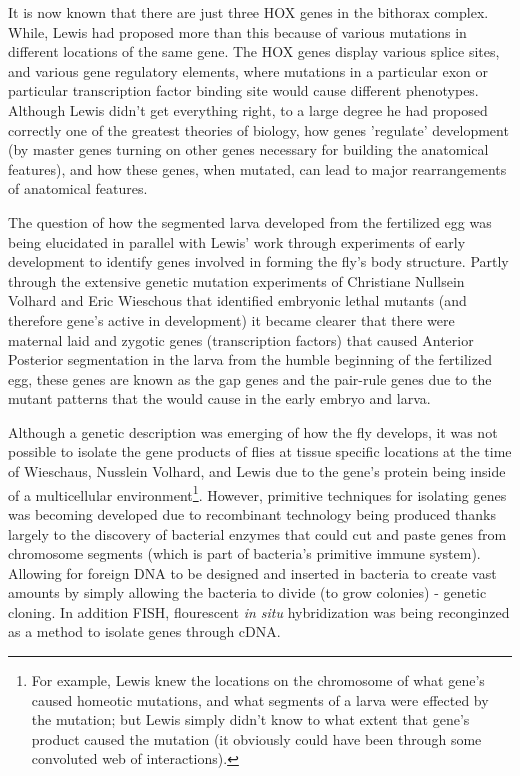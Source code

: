 It is now known that there are just three HOX genes in the bithorax complex.  While, Lewis had proposed more than this because of various mutations in different locations of the same gene.  The HOX genes display various splice sites, and various gene regulatory elements, where mutations in a particular exon or particular transcription factor binding site would cause different phenotypes.  Although Lewis didn't get everything right, to a large degree he had proposed correctly one of the greatest theories of biology, how genes 'regulate' development (by master genes turning on other genes necessary for building the anatomical features), and how these genes, when mutated, can lead to major rearrangements of anatomical features. 

The question of how the segmented larva developed from the fertilized egg was being elucidated in parallel with Lewis' work through experiments of early development to identify genes involved in forming the fly's body structure.  Partly through the extensive genetic mutation experiments of Christiane Nullsein Volhard and Eric Wieschous that identified embryonic lethal mutants (and therefore gene's active in development) it became clearer that there were maternal laid and zygotic genes (transcription factors) that caused Anterior Posterior segmentation in the larva from the humble beginning of the fertilized egg, these genes are known as the gap genes and the pair-rule genes due to the mutant patterns that the would cause in the early embryo and larva\cite{pmid6776413}.  

Although a genetic description was emerging of how the fly develops, it was not possible to isolate the gene products of flies at tissue specific locations at the time of Wieschaus, Nusslein Volhard, and Lewis due to the gene's protein being inside of a multicellular environment\footnote{For example, Lewis knew the locations on the chromosome of what gene's caused homeotic mutations, and what segments of a larva were effected by the mutation; but Lewis simply didn't know to what extent that gene's product caused the mutation (it obviously could have been through some convoluted web of interactions).}.  However, primitive techniques for isolating genes was becoming developed due to recombinant technology being produced thanks largely to the discovery of bacterial enzymes that could cut and paste genes from chromosome segments (which is part of bacteria's primitive immune system).  Allowing for foreign DNA to be designed and inserted in bacteria to create vast amounts by simply allowing the bacteria to  divide (to grow colonies) - genetic cloning. In addition FISH, flourescent \textit{in situ} hybridization was being reconginzed as a method to isolate genes through cDNA.
 
